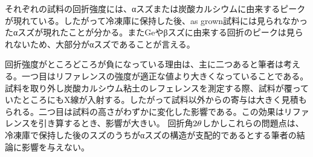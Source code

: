 それぞれの試料の回折強度には、αスズまたは炭酸カルシウムに由来するピークが現れている。したがって冷凍庫に保持した後、as grown試料には見られなかったαスズが現れたことが分かる。またGeやβスズに由来する回折のピークは見られないため、大部分がαスズであることが言える。

回折強度がところどころが負になっている理由は、主に二つあると筆者は考える。一つ目はリファレンスの強度が適正な値より大きくなっていることである。試料を取り外し炭酸カルシウム粘土のレフェレンスを測定する際、試料が覆っていたところにもX線が入射する。したがって試料以外からの寄与は大きく見積もられる。二つ目は試料の高さがわずかに変化した影響である。この効果はリファレンスを引き算するとき、影響が大きい。
回折角$\rm 2\theta$しかしこれらの問題点は、冷凍庫で保持した後のスズのうちがαスズの構造が支配的であるとする筆者の結論に影響を与えない。


